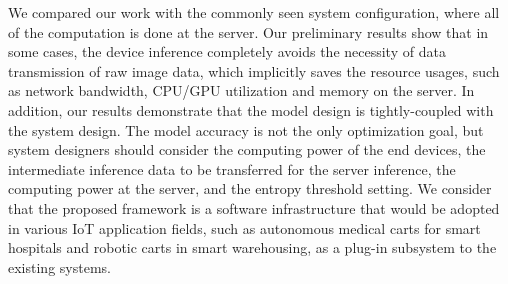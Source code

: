 \documentclass[conference]{IEEEtran}
\begin{document}
We compared our work with the ​commonly seen system configuration, where all of the computation is done at the server.
Our preliminary results show that in some cases, the device inference completely avoids the necessity of data transmission of raw image data, which implicitly saves the resource usages, such as network bandwidth, CPU/GPU utilization and memory on the server. %
In addition, our results demonstrate that the model design is tightly-coupled with the system design. The model accuracy is not the only optimization goal, but system designers should consider the computing power of the end devices, the intermediate inference data to be transferred for the server inference, the computing power at the server, and the entropy threshold setting.
We consider that the proposed framework is a software infrastructure that would be adopted in various IoT application fields, such as autonomous medical carts for smart hospitals and robotic carts in smart warehousing, as a plug-in subsystem to the existing systems.



\tiny



\end{document}
